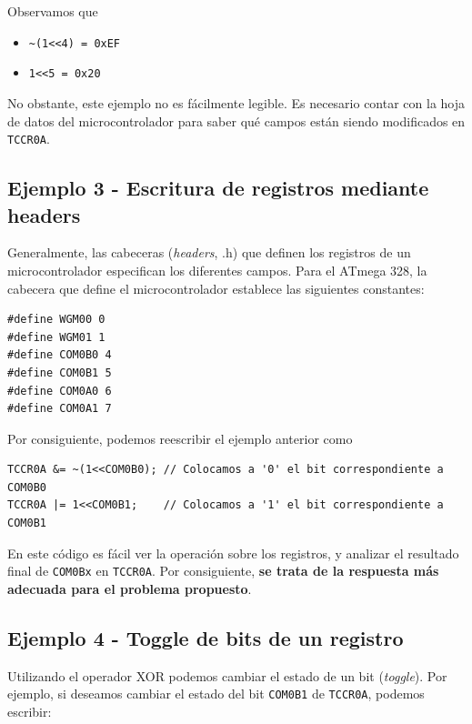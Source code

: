 \documentclass[paper=a4, fontsize=11pt]{scrartcl}	%
\numberwithin{equation}{section} %
\numberwithin{figure}{section} %
\numberwithin{table}{section} %
\begin{document}
Observamos que 
\begin{itemize}
    \item \verb!~(1<<4) = 0xEF!
    \item \verb!1<<5 = 0x20!
\end{itemize}
No obstante, este ejemplo no es fácilmente legible. Es necesario contar
con la hoja de datos del microcontrolador para saber qué campos están
siendo modificados en \verb|TCCR0A|.

\subsection{Ejemplo 3 - Escritura de registros mediante headers}

Generalmente, las cabeceras (\emph{headers}, .h) que definen los
registros de un microcontrolador especifican los diferentes
campos. Para el ATmega 328, la
cabecera que define el microcontrolador establece las siguientes
constantes:

\begin{verbatim}
#define WGM00 0
#define WGM01 1
#define COM0B0 4
#define COM0B1 5
#define COM0A0 6
#define COM0A1 7
\end{verbatim}
Por consiguiente, podemos reescribir el ejemplo anterior como
\begin{verbatim}
TCCR0A &= ~(1<<COM0B0); // Colocamos a '0' el bit correspondiente a COM0B0
TCCR0A |= 1<<COM0B1;    // Colocamos a '1' el bit correspondiente a COM0B1
\end{verbatim}

En este código es fácil ver la operación sobre los registros,
y analizar el resultado final de \verb|COM0Bx| en \verb|TCCR0A|. Por
consiguiente, \textbf{se trata de la respuesta más adecuada para el
problema propuesto}.

\subsection{Ejemplo 4 - Toggle de bits de un registro}

Utilizando el operador XOR podemos cambiar el estado de un bit
(\emph{toggle}). Por ejemplo, si deseamos cambiar el estado del bit
\verb|COM0B1| de \verb|TCCR0A|, podemos escribir:
\end{document}
